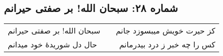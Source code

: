\begin{center}
\section*{شماره ۲۸: سبحان الله! بر صفتی حیرانم}
\label{sec:028}
\begin{longtable}{l p{0.5cm} r}
سبحان الله! بر صفتی حیرانم
&&
کز حیرت خویش میبسوزد جانم
\\
حال دل شوریدهٔ خود میدانم
&&
کس را چه خبر ز درد بیدرمانم
\\
\end{longtable}
\end{center}
